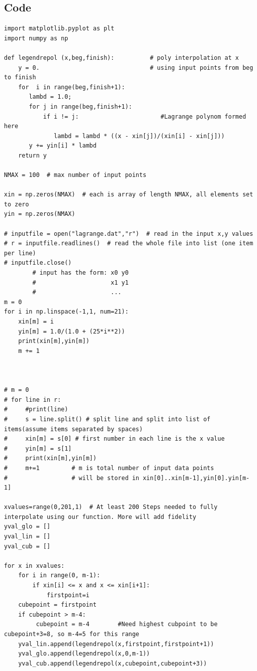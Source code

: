 \documentclass[aps,prb,groupedaddress,nofootinbib,floatfix]{revtex4}
\begin{document}
\subsection*{Code} 
\begin{lstlisting}
import matplotlib.pyplot as plt
import numpy as np

def legendrepol (x,beg,finish):          # poly interpolation at x 
    y = 0.                               # using input points from beg to finish
    for  i in range(beg,finish+1): 
       lambd = 1.0;
       for j in range(beg,finish+1):
           if i != j:                       #Lagrange polynom formed here
              lambd = lambd * ((x - xin[j])/(xin[i] - xin[j]))
       y += yin[i] * lambd
    return y

NMAX = 100  # max number of input points

xin = np.zeros(NMAX)  # each is array of length NMAX, all elements set to zero
yin = np.zeros(NMAX)

# inputfile = open("lagrange.dat","r")  # read in the input x,y values
# r = inputfile.readlines()  # read the whole file into list (one item per line)
# inputfile.close()
        # input has the form: x0 y0
        #                     x1 y1
        #                     ...
m = 0
for i in np.linspace(-1,1, num=21):
    xin[m] = i
    yin[m] = 1.0/(1.0 + (25*i**2))
    print(xin[m],yin[m])
    m += 1

    

# m = 0
# for line in r:
#     #print(line)
#     s = line.split() # split line and split into list of items(assume items separated by spaces)
#     xin[m] = s[0] # first number in each line is the x value
#     yin[m] = s[1]
#     print(xin[m],yin[m])
#     m+=1         # m is total number of input data points
#                  # will be stored in xin[0]..xin[m-1],yin[0].yin[m-1]

xvalues=range(0,201,1)  # At least 200 Steps needed to fully interpolate using our function. More will add fidelity
yval_glo = []
yval_lin = []
yval_cub = []

for x in xvalues:
    for i in range(0, m-1):
        if xin[i] <= x and x <= xin[i+1]:
            firstpoint=i
    cubepoint = firstpoint
    if cubepoint > m-4:
         cubepoint = m-4        #Need highest cubpoint to be cubepoint+3=8, so m-4=5 for this range
    yval_lin.append(legendrepol(x,firstpoint,firstpoint+1))
    yval_glo.append(legendrepol(x,0,m-1))
    yval_cub.append(legendrepol(x,cubepoint,cubepoint+3))





\end{lstlisting}
\end{document}
